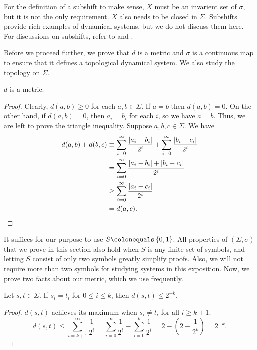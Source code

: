 \documentclass[10pt,twoside]{book}
\begin{document}
For the definition of a subshift to make sense, $X$ must be an invarient set of $\sigma$, but it is not the only requirement.
$X$ also needs to be closed in $\Sigma$.
Subshifts provide rich examples of dynamical systems, but we do not discuss them here.
For discussions on subshifts, refer to \citet{kitchens} and \citet{lind}.

Before we proceed further, we prove that $d$ is a metric and $\sigma$ is a continuous map to ensure that it defines a topological dynamical system.
We also study the topology on $\Sigma$.
\begin{proposition}
  $d$ is a metric.
  \label{prop:symb-metric}
  \begin{proof}
    Clearly, $d(a,b) \geq 0$ for each $a,b \in \Sigma$.
    If $a = b$ then $d(a,b) = 0$.
    On the other hand, if $d(a,b) = 0$, then $a_i = b_i$ for each $i$, so we have $a = b$.
    Thus, we are left to prove the triangle inequality.
    Suppose $a,b,c \in \Sigma$.
    We have
    \begin{align*}
      d(a,b) + d(b,c)
      &\equiv \sum\limits_{i = 0}^{\infty} \frac{\left | a_i - b_i \right |}{2^i}  +  \sum\limits_{i = 0}^{\infty} \frac{\left | b_i - c_i \right |}{2^i}  \\
      &= \sum\limits_{i = 0}^{\infty} \frac{\left | a_i - b_i \right | + \left | b_i - c_i \right |}{2^i}  \\
      &\geq \sum\limits_{i = 0}^{\infty} \frac{\left | a_i - c_i \right |}{2^i}  \\
      &= d(a,c).
    \end{align*}
  \end{proof}
\end{proposition}
It suffices for our purpose to use $S \ceq \set{0,1}$.
All properties of $(\Sigma, \sigma)$ that we prove in this section also hold when $S$ is any finite set of symbols, and letting $S$ consist of only two symbols greatly simplify proofs.
Also, we will not require more than two symbols for studying systems in this exposition.
Now, we prove two facts about our metric, which we use frequently.
\begin{proposition}
  Let $s, t \in \Sigma$.
  If $s_i = t_i$ for $0 \leq i \leq k$, then $d(s,t) \leq 2^{-k}$.
  \label{prop:symbol-bound1}
  \begin{proof}
    $d(s,t)$ achieves its maximum when $s_i \neq t_i$ for all $i \geq k+1$.
    \begin{equation*}
      d(s,t) 
      \leq \sum\limits_{i = k+1}^{\infty} \frac{1}{2^i}
      = \sum\limits_{i = 0}^{\infty} \frac{1}{2^i} - \sum\limits_{i = 0}^{k} \frac{1}{2^i}
      = 2 - (2 - \frac{1}{2^{k}})
      = 2^{-k}.
    \end{equation*}
  \end{proof}
\end{proposition}
\end{document}
